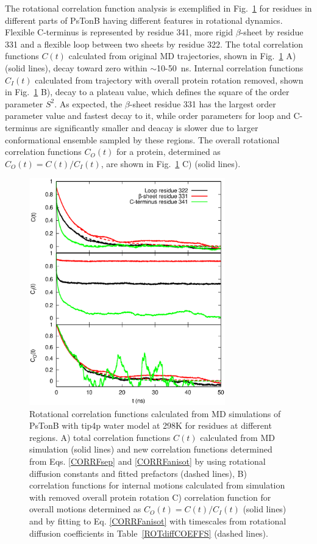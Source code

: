 \documentclass[pre,aps,floatfix,authordate1-4,twocolumn]{revtex4-1}
\begin{document}
The rotational correlation function analysis is exemplified in
Fig.~\ref{exampleCORRF} for residues in different parts of PsTonB
having different features in rotational dynamics.
Flexible C-terminus is represented by residue 341,
more rigid $\beta$-sheet by residue 331 and a
flexible loop between two sheets by residue 322. 
The total correlation functions $C(t)$ calculated from original MD trajectories,
shown in Fig.~\ref{exampleCORRF} A) (solid lines),
decay toward zero within $\sim$10-50~ns. 
Internal correlation functions $C_I(t)$ calculated from trajectory with overall
protein rotation removed, shown in Fig.~\ref{exampleCORRF} B),
decay to a plateau value, which defines the square of the order parameter $S^2$.
As expected, the $\beta$-sheet residue 331 has the largest order parameter value
and fastest decay to it, while order parameters for loop and C-terminus are
significantly smaller and deacay is slower due to larger conformational ensemble
sampled by these regions. The overall rotational correlation functions $C_O(t)$
for a protein, determined as $C_O(t)=C(t)/C_I(t)$, are shown in Fig.~\ref{exampleCORRF} C) (solid lines).
\begin{figure}[!h]
  \includegraphics[width=8.5cm]{../Figs/exampleCORRF2.eps}%
  \caption{Rotational correlation functions calculated from MD simulations of PsTonB with tip4p water
    model at 298K for residues at different regions.
    A) total correlation functions $C(t)$ calculated from MD simulation (solid lines) and
    new correlation functions determined from Eqs. \ref{CORRFsep} and \ref{CORRFanisot} by
    using rotational diffusion constants and fitted prefactors (dashed lines),
    B) correlation functions for internal motions calculated from simulation with removed overall protein rotation
    C) correlation function for overall motions determined as $C_O(t)=C(t)/C_I(t)$ (solid lines) and by fitting
    to Eq. \ref{CORRFanisot} with timescales from rotational diffusion coefficients in Table~\ref{ROTdiffCOEFFS} (dashed lines).
    }\label{exampleCORRF}
\end{figure}
\end{document}
